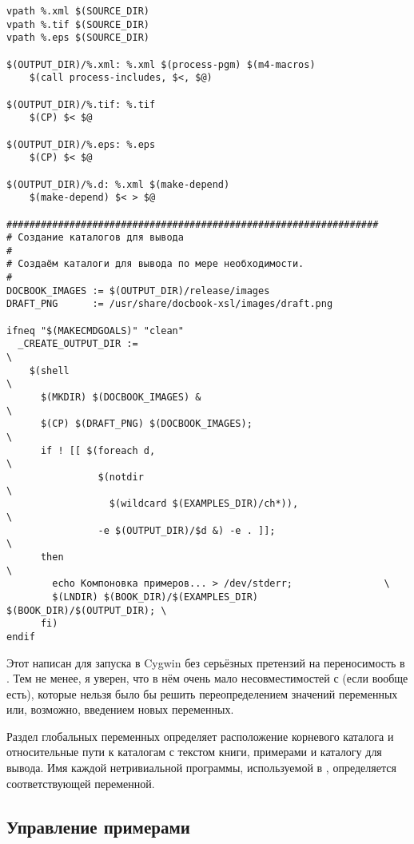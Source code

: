 \begin{verbatim}
vpath %.xml $(SOURCE_DIR)
vpath %.tif $(SOURCE_DIR)
vpath %.eps $(SOURCE_DIR)

$(OUTPUT_DIR)/%.xml: %.xml $(process-pgm) $(m4-macros)
    $(call process-includes, $<, $@)

$(OUTPUT_DIR)/%.tif: %.tif
    $(CP) $< $@

$(OUTPUT_DIR)/%.eps: %.eps
    $(CP) $< $@

$(OUTPUT_DIR)/%.d: %.xml $(make-depend)
    $(make-depend) $< > $@

#################################################################
# Создание каталогов для вывода
#
# Создаём каталоги для вывода по мере необходимости.
#
DOCBOOK_IMAGES := $(OUTPUT_DIR)/release/images
DRAFT_PNG      := /usr/share/docbook-xsl/images/draft.png

ifneq "$(MAKECMDGOALS)" "clean"
  _CREATE_OUTPUT_DIR :=                                                 \
    $(shell                                                             \
      $(MKDIR) $(DOCBOOK_IMAGES) &                                      \
      $(CP) $(DRAFT_PNG) $(DOCBOOK_IMAGES);                             \
      if ! [[ $(foreach d,                                              \
                $(notdir                                                \
                  $(wildcard $(EXAMPLES_DIR)/ch*)),                     \
                -e $(OUTPUT_DIR)/$d &) -e . ]];                         \
      then                                                              \
        echo Компоновка примеров... > /dev/stderr;                \
        $(LNDIR) $(BOOK_DIR)/$(EXAMPLES_DIR) $(BOOK_DIR)/$(OUTPUT_DIR); \
      fi)
endif
\end{verbatim}

Этот \Makefile{} написан для запуска в Cygwin без серьёзных претензий
на переносимость в \UNIX{}. Тем не менее, я уверен, что в нём очень
мало несовместимостей с \UNIX{} (если вообще есть), которые нельзя
было бы решить переопределением значений переменных или, возможно,
введением новых переменных.

Раздел глобальных переменных определяет расположение корневого
каталога и относительные пути к каталогам с текстом книги, примерами и
каталогу для вывода. Имя каждой нетривиальной программы, используемой
в \makefile{е}, определяется соответствующей переменной.

\subsection{Управление примерами}


